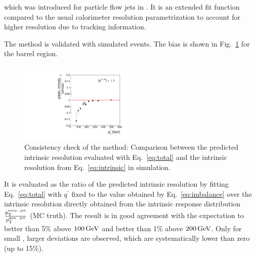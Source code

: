 which was introduced for particle flow jets in \cite{Chatrchyan:2011ds}. 
It is an extended fit function compared to the usual calorimeter resolution parametrization to account for higher resolution due to tracking information. 

The method is validated with simulated events. 
The bias  is shown in \mbox{Fig. \ref{fig:MCClosure}} for the barrel region. 
\begin{figure}[t]
  \centering

    \includegraphics[width=0.49\textwidth]{figures/resolution/methodology/MCClosure_for_1_eta_bin_RMS99_barrel_0p2range.pdf}

  \caption{Consistency check of the method: 
           Comparison between the predicted intrinsic resolution evaluated with \mbox{Eq.~\eqref{eq:total}} 
           and the intrinsic resolution from \mbox{Eq.~\eqref{eq:intrinsic}} in simulation.}  
  \label{fig:MCClosure}
\end{figure}
It is evaluated as the ratio of the predicted intrinsic resolution by fitting \mbox{Eq.~\eqref{eq:total}} with $q^{\prime}$
fixed to the value obtained by \mbox{Eq.~\eqref{eq:imbalance}} over the intrinsic resolution directly obtained from the intrinsic response distribution 
$\frac{p_{\text{T}}^{\text{reco. jet}}}{p_{\text{T}}^{\text{gen. jet}}}$ (MC truth).
The result is in good agreement with the expectation to better than 5\% above $100\,\text{Ge}\kern-0.06667em\text{V}$ and better than 1\% above $200\,\text{Ge}\kern-0.06667em\text{V}$.
Only for small \pt, larger deviations are observed, which are systematically lower than zero (up to 15\%).

